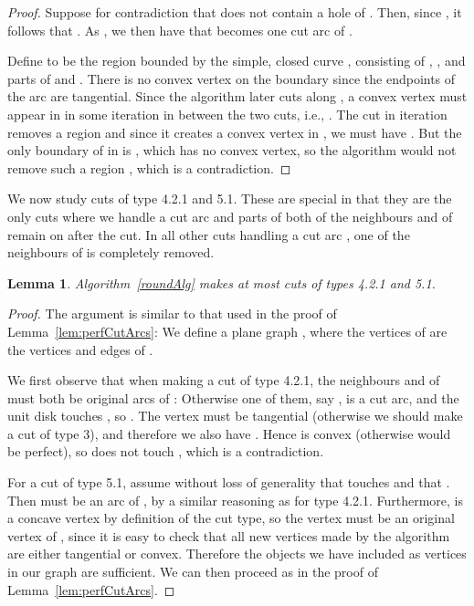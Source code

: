\documentclass{article}
\newtheorem{lemma}[theorem]{Lemma}
\begin{document}
\begin{proof}
Suppose for contradiction that  does not contain a hole of .
Then, since , it follows that .
As , we then have that  becomes one cut arc of .

Define  to be the region bounded by the simple, closed curve , consisting of , , and parts of  and .
There is no convex vertex on the boundary  since the endpoints of the arc  are tangential.
Since the algorithm later cuts along , a convex vertex must appear in  in some iteration  in between the two cuts, i.e., .
The cut in iteration  removes a region  and since it creates a convex vertex in , we must have .
But the only boundary of  in  is , which has no convex vertex, so the algorithm would not remove such a region , which is a contradiction.
\end{proof}

We now study cuts of type 4.2.1 and 5.1.
These are special in that they are the only cuts where we handle a cut arc  and parts of both of the neighbours  and  of  remain on  after the cut.
In all other cuts handling a cut arc , one of the neighbours of  is completely removed.

\begin{lemma}\label{lem:nperfectcutarcs}
Algorithm~\ref{roundAlg} makes at most  cuts of types 4.2.1 and 5.1.
\end{lemma}

\begin{proof}
The argument is similar to that used in the proof of Lemma~\ref{lem:perfCutArcs}:
We define a plane graph , where the vertices of  are the vertices and edges of .


We first observe that when making a cut of type 4.2.1, the neighbours  and  of  must both be original arcs of :
Otherwise one of them, say , is a cut arc, and the unit disk  touches , so .
The vertex  must be tangential (otherwise we should make a cut of type 3), and therefore we also have .
Hence  is convex (otherwise  would be perfect), so  does not touch , which is a contradiction.

For a cut of type 5.1, assume without loss of generality that  touches  and that .
Then  must be an arc of , by a similar reasoning as for type 4.2.1.
Furthermore,  is a concave vertex by definition of the cut type, so the vertex must be an original vertex of , since it is easy to check that all new vertices made by the algorithm are either tangential or convex.
Therefore the objects we have included as vertices in our graph  are sufficient.
We can then proceed as in the proof of Lemma~\ref{lem:perfCutArcs}.
\end{proof}
\end{document}
